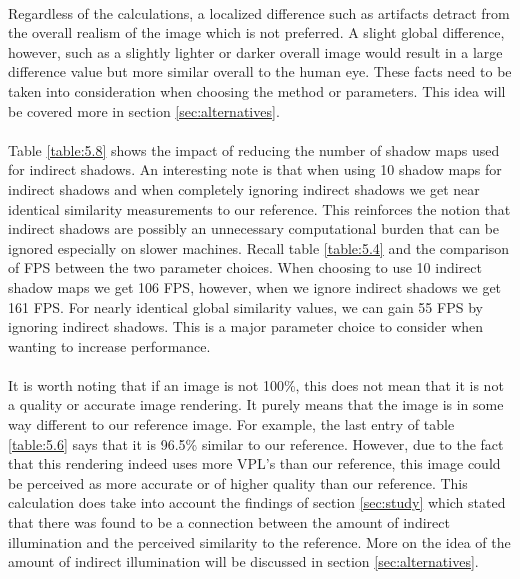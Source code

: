 \paragraph{}
Regardless of the calculations, a localized difference such as artifacts detract from the overall realism of the image which is not preferred.  A slight global difference, however, such as a slightly lighter or darker overall image would result in a large difference value but more similar overall to the human eye.  These facts need to be taken into consideration when choosing the method or parameters.  This idea will be covered more in section \ref{sec:alternatives}.

\paragraph{}
Table \ref{table:5.8} shows the impact of reducing the number of shadow maps used for indirect shadows.  An interesting note is that when using 10 shadow maps for indirect shadows and when completely ignoring indirect shadows we get near identical similarity measurements to our reference.  This reinforces the notion that indirect shadows are possibly an unnecessary computational burden that can be ignored especially on slower machines.  Recall table \ref{table:5.4} and the comparison of FPS between the two parameter choices.  When choosing to use 10 indirect shadow maps we get 106 FPS, however, when we ignore indirect shadows we get 161 FPS.  For nearly identical global similarity values, we can gain 55 FPS by ignoring indirect shadows.  This is a major parameter choice to consider when wanting to increase performance.

\paragraph{}
It is worth noting that if an image is not 100\%, this does not mean that it is not a quality or accurate image rendering.  It purely means that the image is in some way different to our reference image.  For example, the last entry of table \ref{table:5.6} says that it is 96.5\% similar to our reference.  However, due to the fact that this rendering indeed uses more VPL's than our reference, this image could be perceived as more accurate or of higher quality than our reference.  This calculation does take into account the findings of section \ref{sec:study} which stated that there was found to be a connection between the amount of indirect illumination and the perceived similarity to the reference.  More on the idea of the amount of indirect illumination will be discussed in section \ref{sec:alternatives}.

